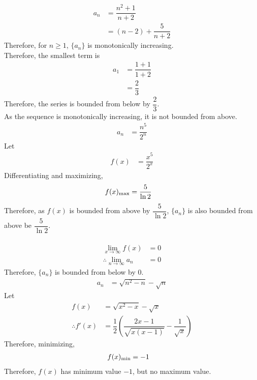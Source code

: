 \documentclass[fleqn, a4paper, 12pt, oneside]{amsart}
\theoremstyle{definition}
\theoremstyle{theorem}
\begin{document}
\begin{solution}
	\begin{tasks}
		\task
			\begin{align*}
				a_n &= \dfrac{n^2 + 1}{n + 2}\\
				&= (n - 2) + \dfrac{5}{n + 2}
			\end{align*}
			Therefore, for $n \ge 1$, $\{a_n\}$ is monotonically increasing.\\
			Therefore, the smallest term is
			\begin{align*}
				a_1 &= \dfrac{1 + 1}{1 + 2}\\
				&= \dfrac{2}{3}
			\end{align*}
			Therefore, the series is bounded from below by $\dfrac{2}{3}$.\\
			As the sequence is monotonically increasing, it is not bounded from above.
		\task 
			\begin{align*}
				a_n &= \dfrac{n^5}{2^n}
			\end{align*}
			Let
			\begin{align*}
				f(x) &= \dfrac{x^5}{2^x}
			\end{align*}
			Differentiating and maximizing,
			\begin{align*}
				f(x)_{\textnormal{max}} &= \dfrac{5}{\ln 2}
			\end{align*}
			Therefore, as $f(x)$ is bounded from above by $\dfrac{5}{\ln 2}$, $\{a_n\}$ is also bounded from above be $\dfrac{5}{\ln 2}$.\\
			~\\
			\begin{align*}
				\lim\limits_{x \to \infty} f(x) &= 0\\
				\therefore \lim\limits_{n \to \infty} a_n &= 0
			\end{align*}
			Therefore, $\{a_n\}$ is bounded from below by $0$.
		\task
			\begin{align*}
				a_n &= \sqrt{n^2 - n} - \sqrt{n}
			\end{align*}
			Let
			\begin{align*}
				f(x) &= \sqrt{x^2 - x} - \sqrt{x}\\
				\therefore f'(x) &= \dfrac{1}{2} \left( \dfrac{2x - 1}{\sqrt{x (x  -1)}} - \dfrac{1}{\sqrt{x}} \right)
			\end{align*}
			Therefore, minimizing,
			\begin{align*}
				f(x)_{\textnormal{min}} &= -1
			\end{align*}
			Therefore, $f(x)$ has minimum value $-1$, but no maximum value.

\end{tasks}
\end{solution}
\end{document}
